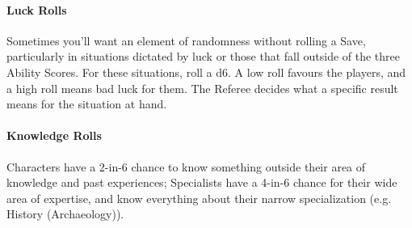 \documentclass[itdr]{subfiles}
\begin{document}
\paragraph{Luck Rolls}
Sometimes you'll want an element of randomness without rolling a Save, particularly in situations dictated by luck or those that fall outside of the three Ability Scores. For these situations, roll a d6. A low roll favours the players, and a high roll means bad luck for them. The Referee decides what a specific result means for the situation at hand.

\paragraph{Knowledge Rolls}
Characters have a 2-in-6 chance to know something outside their area of knowledge and past experiences; Specialists have a 4-in-6 chance for their wide area of expertise, and know everything about their narrow specialization (e.g. History (Archaeology)).
\end{document}
